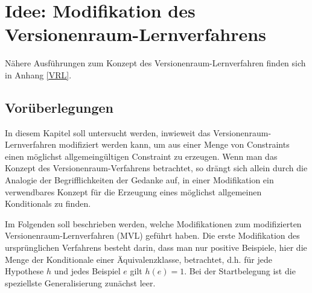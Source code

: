 \documentclass[a4paper, 11pt]{book}
\begin{document}
	\section{Idee: Modifikation des Versionenraum-Lernverfahrens} \label{Verwendbar VRL}  
	Nähere Ausführungen zum Konzept des Versionenraum-Lernverfahren finden sich in Anhang \ref{VRL}.\\
	\subsection{Vorüberlegungen}
	In diesem Kapitel soll untersucht werden, inwieweit das Versionenraum-Lernverfahren modifiziert werden kann, um aus einer Menge von Constraints einen möglichst allgemeingültigen Constraint zu erzeugen. Wenn man das Konzept des Versionenraum-Verfahrens betrachtet, so drängt sich allein durch die Analogie der Begrifflichkeiten der Gedanke auf, in einer Modifikation ein verwendbares Konzept für die Erzeugung eines möglichst allgemeinen Konditionals zu finden.
	
	Im Folgenden soll beschrieben werden, welche Modifikationen zum modifizierten\\ Versionenraum-Lernverfahren (MVL)  geführt haben.
	Die erste Modifikation des ursprünglichen Verfahrens besteht darin, dass man nur positive Beispiele, hier die Menge der Konditionale einer Äquivalenzklasse, betrachtet, d.h. für jede Hypothese $ h $ und jedes Beispiel $ e $ gilt $ h(e) = 1 $.
	Bei der Startbelegung ist die speziellste Generalisierung zunächst leer. 
\end{document}
